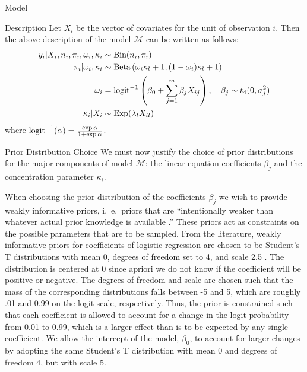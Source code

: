 \begin{chapter}{Model}
\begin{section}{Description}
  Let $X_i$ be the vector of covariates for the unit of observation $i$. Then
  the above description of the model $\mathcal{M}$ can be written as follows:
  \begin{align*}
    y_i | X_i, n_i, \pi_i, \omega_i, \kappa_i &\sim \text{Bin}(n_i, \pi_i) \\
    \pi_i | \omega_i, \kappa_i &\sim \text{Beta}\left(\omega_i \kappa_l + 1, (1 - \omega_i) \kappa_l + 1\right) \\
    \omega_i &= \operatorname{logit}^{-1}\left(\beta_0 + \sum_{j=1}^m  \beta_j X_{ij}\right), \quad \beta_j \sim t_4(0, \sigma_j^2) \\
    \kappa_i | X_i &\sim \text{Exp}(\lambda_l X_{il})
  \end{align*}
  where $\operatorname{logit}^{-1}(\alpha) = \frac{\exp{\alpha}}{1 + \exp{\alpha}}$.
\end{section}

\begin{section}{Prior Distribution Choice}
  We must now justify the choice of prior distributions for the major components of model $\mathcal{M}$:
  the linear equation coefficients $\beta_j$ and the concentration
  parameter $\kappa_i$.

  When choosing the prior distribution of the coefficients $\beta_j$ we wish to provide weakly informative
  priors, i.\ e.\ priors that are ``intentionally weaker than whatever actual prior knowledge is available \cite{bda3}.''
  These priors act as constraints on the possible parameters that are to be sampled. From the literature,
  weakly informative priors for coefficients of logistic regression are chosen to be Student's T distributions
  with mean 0, degrees of freedom set to 4, and scale 2.5 \cite{bda3}.
  The distribution is centered at 0 since apriori we do not
  know if the coefficient will be positive or negative. The degrees of
  freedom and scale are chosen such that the mass of the corresponding distributions falls between -5 and 5,
  which are roughly .01 and 0.99 on the logit scale, respectively.
  Thus, the prior is constrained such that each coefficient
  is allowed to account for a change in the logit probability from 0.01 to 0.99, which is a larger effect than is to be expected
  by any single coefficient. We allow the intercept of the model, $\beta_0$, to account for larger changes by adopting the same Student's T distribution
  with mean 0 and degrees of freedom 4, but with scale 5.


\end{section}
\end{chapter}
